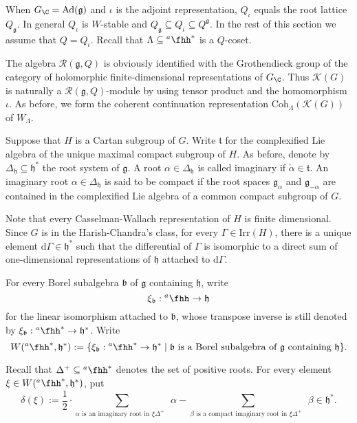 \documentclass[12pt]{amsart}
\def\subset{\subseteq}
\newcommand{\CK}{{\mathcal {K}}}
\newcommand{\g}{\mathfrak g}
\newcommand{\h}{\mathfrak h}
\renewcommand{\b}{\mathfrak b}
\renewcommand{\t}{\mathfrak t}
\newcommand{\be}{\begin {equation}}
\newcommand{\ee}{\end {equation}}
\numberwithin{equation}{section}
\theoremstyle{remark}
\def\Irr{\mathrm{Irr}}
\def\hha{{}^a\fhh}
\def\Coh{\mathrm{Coh}}
\newcommand{\Lam}{{[\lambda]}}
\begin{document}
When $G_\C=\mathrm{Ad}(\g)$ and $\iota$ is the adjoint representation, $Q_\iota$ equals the root lattice $Q_\g$. In general $Q_\iota$ is $W$-stable and $Q_\g\subseteq Q_\iota \subseteq Q^\g$.
In the rest of this section we assume that $Q=Q_\iota$. Recall that $\Lambda\subset \hha^*$ is a $Q$-coset.



The algebra $\mathcal R(\g, Q)$ is obviously identified with  the Grothendieck group of the category of holomorphic finite-dimensional representations of $G_\C$.  Thus $\CK(G)$ is naturally a $\mathcal R(\g, Q)$-module by using tensor product and the homomorphism $\iota$. As before, we form the coherent continuation representation $\Coh_\Lambda(\CK(G))$ of $W_\Lambda$.






 Suppose that $H$ is a  Cartan subgroup of $G$. Write $\t$ for the complexified Lie algebra of the unique maximal compact subgroup of $H$. As before, denote by $\Delta_\h\subset \h^*$ the root system of $\g$. A root $\alpha\in \Delta_\h$ is called imaginary if $\check \alpha\in \t$. An imaginary root $\alpha\in \Delta_\h$ is said to be compact if the root spaces $\g_\alpha$ and $\g_{-\alpha}$ are contained in  the  complexified Lie algebra of a common compact subgroup of $G$.

Note that every Casselman-Wallach representation of $H$ is finite dimensional. Since $G$ is in the Harish-Chandra's class,
 for every $\Gamma\in \Irr(H)$,
there is a unique element $\mathrm d \Gamma\in \h^*$ such that the differential of $\Gamma$ is isomorphic to a direct sum of  one-dimensional representations of $\h$ attached to $\mathrm d  \Gamma$.

For every Borel subalgebra $\b$ of $\g$ containing $\h$, write
\be\label{xib00}
  \xi_\b: \hha\rightarrow \h
\ee
for the linear isomorphism attached to $\b$, whose transpose inverse is still denoted by $ \xi_\b: \hha^*\rightarrow \h^*$. Write
\[
  W(\hha^*, \h^*):=\{ \xi_\b: \hha^*\rightarrow \h^*\mid \textrm{$\b$ is a Borel subalgebra of $\g$ containing $\h$}\}.
  \]

Recall that $ \Delta^+\subset \hha^*$ denotes the set of positive roots. For every element $\xi\in  W(\hha^*, \h^*)$,  put
\be\label{deltawb}
  \delta(\xi):=\frac{1}{2}\cdot \sum_{\alpha \textrm{ is an imaginary root in $\xi \Delta^+$ }} \alpha- \sum_{\beta \textrm{ is a compact imaginary root in $\xi \Delta^+$ }}\beta \in \h^*.
\ee
\end{document}
